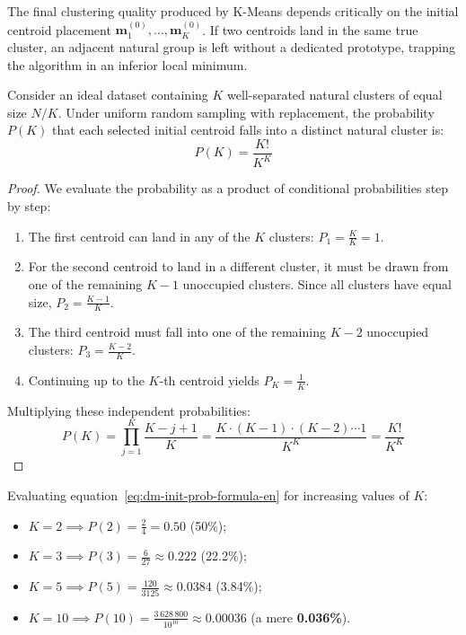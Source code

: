 The final clustering quality produced by K-Means depends critically on the initial centroid placement $\mathbf{m}_1^{(0)}, \dots, \mathbf{m}_K^{(0)}$. If two centroids land in the same true cluster, an adjacent natural group is left without a dedicated prototype, trapping the algorithm in an inferior local minimum.

\begin{theorem}
Consider an ideal dataset containing $K$ well-separated natural clusters of equal size $N/K$. Under uniform random sampling with replacement, the probability $P(K)$ that each selected initial centroid falls into a distinct natural cluster is:
\begin{equation}
    P(K) = \frac{K!}{K^K}
    \label{eq:dm-init-prob-formula-en}
\end{equation}
\end{theorem}

\begin{proof}
We evaluate the probability as a product of conditional probabilities step by step:
\begin{enumerate}
    \item The first centroid can land in any of the $K$ clusters: $P_1 = \frac{K}{K} = 1$.
    \item For the second centroid to land in a different cluster, it must be drawn from one of the remaining $K-1$ unoccupied clusters. Since all clusters have equal size, $P_2 = \frac{K-1}{K}$.
    \item The third centroid must fall into one of the remaining $K-2$ unoccupied clusters: $P_3 = \frac{K-2}{K}$.
    \item Continuing up to the $K$-th centroid yields $P_K = \frac{1}{K}$.
\end{enumerate}
Multiplying these independent probabilities:
\begin{equation}
    P(K) = \prod_{j=1}^K \frac{K - j + 1}{K} = \frac{K \cdot (K-1) \cdot (K-2) \cdots 1}{K^K} = \frac{K!}{K^K}
\end{equation}
\end{proof}

Evaluating equation~\eqref{eq:dm-init-prob-formula-en} for increasing values of $K$:
\begin{itemize}[noitemsep]
    \item $K = 2 \implies P(2) = \frac{2}{4} = 0.50$ (50\%);
    \item $K = 3 \implies P(3) = \frac{6}{27} \approx 0.222$ (22.2\%);
    \item $K = 5 \implies P(5) = \frac{120}{3125} \approx 0.0384$ (3.84\%);
    \item $K = 10 \implies P(10) = \frac{3\,628\,800}{10^{10}} \approx 0.00036$ (a mere \textbf{0.036\%}).
\end{itemize}

